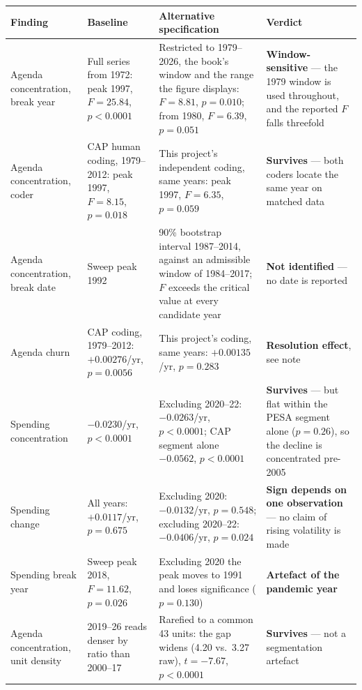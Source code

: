 \begin{threeparttable}
\caption{Sensitivity of the policy-agenda and spending findings}
\begin{tabular}{p{2.6cm} p{3.6cm} p{4.2cm} p{2.6cm}}
\toprule
Finding & Baseline & Alternative specification & Verdict \\
\midrule
Agenda concentration, break year & Full series from 1972: peak 1997, $F=25.84$, $p<0.0001$ &
Restricted to 1979--2026, the book's window and the range the figure displays: $F=8.81$, $p=0.010$;
from 1980, $F=6.39$, $p=0.051$ & \textbf{Window-sensitive} --- the 1979 window is used throughout,
and the reported $F$ falls threefold \\
Agenda concentration, coder & CAP human coding, 1979--2012: peak 1997, $F=8.15$, $p=0.018$ &
This project's independent coding, same years: peak 1997, $F=6.35$, $p=0.059$ &
\textbf{Survives} --- both coders locate the same year on matched data \\
Agenda concentration, break date & Sweep peak 1992 & 90\% bootstrap interval 1987--2014, against an
admissible window of 1984--2017; $F$ exceeds the critical value at every candidate year &
\textbf{Not identified} --- no date is reported \\
Agenda churn & CAP coding, 1979--2012: $+0.00276$/yr, $p=0.0056$ & This project's coding, same
years: $+0.00135$/yr, $p=0.283$ & \textbf{Resolution effect}, see note \\
Spending concentration & $-0.0230$/yr, $p<0.0001$ & Excluding 2020--22: $-0.0263$/yr, $p<0.0001$;
CAP segment alone $-0.0562$, $p<0.0001$ & \textbf{Survives} --- but flat within the PESA segment
alone ($p=0.26$), so the decline is concentrated pre-2005 \\
Spending change & All years: $+0.0117$/yr, $p=0.675$ & Excluding 2020: $-0.0132$/yr, $p=0.548$;
excluding 2020--22: $-0.0406$/yr, $p=0.024$ & \textbf{Sign depends on one observation} --- no claim
of rising volatility is made \\
Spending break year & Sweep peak 2018, $F=11.62$, $p=0.026$ & Excluding 2020 the peak moves to 1991
and loses significance ($p=0.130$) & \textbf{Artefact of the pandemic year} \\
Agenda concentration, unit density & 2019--26 reads denser by ratio than 2000--17 & Rarefied to a
common 43 units: the gap widens (4.20 vs.\ 3.27 raw), $t=-7.67$, $p<0.0001$ &
\textbf{Survives} --- not a segmentation artefact \\
\bottomrule
\end{tabular}

\end{threeparttable}
